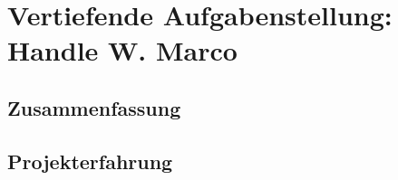 \chapter[Handle]{Vertiefende Aufgabenstellung: Handle W. Marco}

\section{Zusammenfassung}

\section{Projekterfahrung}
